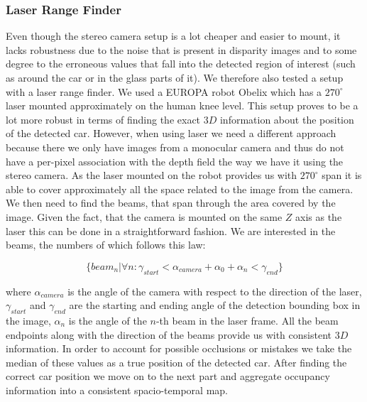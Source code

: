         \subsubsection{Laser Range Finder}\label{ssub:laser_range_finder}

            Even though the stereo camera setup is a lot cheaper and easier to
            mount, it lacks robustness due to the noise that is present in
            disparity images and to some degree to the erroneous values that
            fall into the detected region of interest (such as around the car
            or in the glass parts of it). We therefore also tested a setup
            with a laser range finder. We used a EUROPA robot Obelix which has
            a $270^\circ$ laser mounted approximately on the human knee level.
            This setup proves to be a lot more robust in terms of finding the
            exact $3D$ information about the position of the detected car.
            However, when using laser we need a different approach because
            there we only have images from a monocular camera and thus do not
            have a per-pixel association with the depth field the way we have
            it using the stereo camera. As the laser mounted on the robot
            provides us with $270^\circ$ span it is able to cover
            approximately all the space related to the image from the camera.
            We then need to find the beams, that span through the area covered
            by the image. Given the fact, that the camera is mounted on the
            same $Z$ axis as the laser this can be done in a straightforward
            fashion. We are interested in the beams, the numbers of which
            follows this law:

            \begin{equation}
                 \{ beam_n | \forall n : \gamma_{start} < \alpha_{camera} + \alpha_{0} + \alpha_{n} < \gamma_{end} \}
            \end{equation}

            where $\alpha_{camera}$ is the angle of the camera with respect to
            the direction of the laser, $\gamma_{start}$ and $\gamma_{end}$
            are the starting and ending angle of the detection bounding box in
            the image, $\alpha_{n}$ is the angle of the $n$-th beam in the
            laser frame. All the beam endpoints along with the direction of
            the beams provide us with consistent $3D$ information. In order to
            account for possible occlusions or mistakes we take the median of
            these values as a true position of the detected car. After finding
            the correct car position we move on to the next part and aggregate
            occupancy information into a consistent spacio-temporal map.

